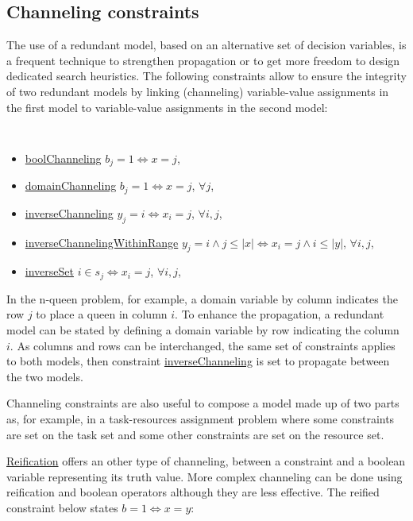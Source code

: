 \subsection{Channeling constraints}\label{model:channelingconstraints}\hypertarget{model:channelingconstraints}{}
The use of a redundant model, based on an alternative set of decision variables, is a frequent technique to strengthen propagation or to get more freedom to design dedicated search heuristics. 
The following constraints allow to ensure the integrity of two redundant models by linking (channeling) variable-value assignments in the first model to variable-value assignments in the second model:
\begin{notedef}\tt
  \begin{itemize}
  \item \hyperlink{boolchanneling:boolchannelingconstraint}{boolChanneling} $b_j=1 \iff x=j$, 
  \item \hyperlink{domainchanneling:domainchannelingconstraint}{domainChanneling} $b_j=1 \iff x=j$, $\forall j$, 
  \item \hyperlink{inversechanneling:inversechannelingconstraint}{inverseChanneling} $y_j=i \iff x_i=j$, $\forall i, j$, 
  \item \hyperlink{inversechannelingwithinrange:inversechannelingconstraintwithinrange}{inverseChannelingWithinRange} $y_j=i \wedge j \le |x| \iff x_i=j \wedge i \le |y|$, $\forall i, j$, 
  \item \hyperlink{inverseset:inversesetconstraint}{inverseSet} $i\in s_j \iff x_i=j$, $\forall i,j$, 
  \end{itemize}
\end{notedef}
In the n-queen problem, for example, a domain variable by column indicates the row $j$ to place a queen in column $i$. To enhance the propagation, a redundant model can be stated by defining a domain variable by row indicating the column $i$. As columns and rows can be interchanged, the same set of constraints applies to both models, then constraint \hyperlink{inversechanneling:inversechannelingconstraint}{inverseChanneling} is set to propagate between the two models.


Channeling constraints are also useful to compose a model made up of two parts as, for example, in a task-resources assignment problem where some constraints are set on the task set and some other constraints are set on the resource set.

\hyperlink{model:reifiedconstraints}{Reification} offers an other type of channeling, between a constraint and a boolean variable representing its truth value. 
More complex channeling can be done using reification and boolean operators although they are less effective. 
The reified constraint below states $b=1\iff x=y$:



